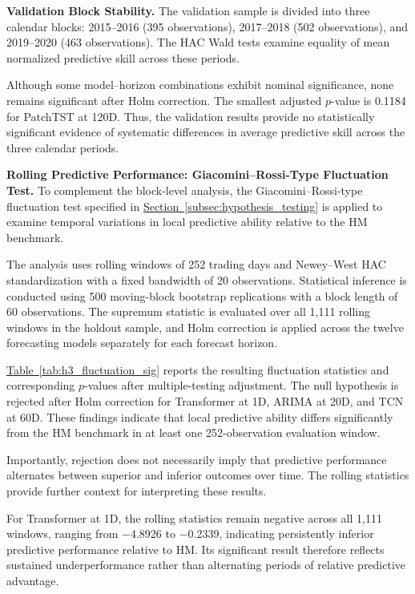\documentclass[12pt,twoside]{ord}
\begin{document}
\noindent\textbf{Validation Block Stability.}
The validation sample is divided into three calendar blocks: 2015--2016 (395 observations), 2017--2018 (502 observations), and 2019--2020 (463 observations). The HAC Wald tests examine equality of mean normalized predictive skill across these periods.

Although some model--horizon combinations exhibit nominal significance, none remains significant after Holm correction. The smallest adjusted $p$-value is 0.1184 for PatchTST at 120D. Thus, the validation results provide no statistically significant evidence of systematic differences in average predictive skill across the three calendar periods.

\medskip
\noindent\textbf{Rolling Predictive Performance: Giacomini--Rossi-Type Fluctuation Test.}
To complement the block-level analysis, the Giacomini--Rossi-type fluctuation test specified in \hyperref[subsec:hypothesis_testing]{Section~\ref*{subsec:hypothesis_testing}} is applied to examine temporal variations in local predictive ability relative to the HM benchmark.

The analysis uses rolling windows of 252 trading days and Newey--West HAC standardization with a fixed bandwidth of 20 observations. Statistical inference is conducted using 500 moving-block bootstrap replications with a block length of 60 observations. The supremum statistic is evaluated over all 1,111 rolling windows in the holdout sample, and Holm correction is applied across the twelve forecasting models separately for each forecast horizon.

\hyperref[tab:h3_fluctuation_sig]{Table~\ref*{tab:h3_fluctuation_sig}} reports the resulting fluctuation statistics and corresponding $p$-values after multiple-testing adjustment. The null hypothesis is rejected after Holm correction for Transformer at 1D, ARIMA at 20D, and TCN at 60D. These findings indicate that local predictive ability differs significantly from the HM benchmark in at least one 252-observation evaluation window.

Importantly, rejection does not necessarily imply that predictive performance alternates between superior and inferior outcomes over time. The rolling statistics provide further context for interpreting these results.

For Transformer at 1D, the rolling statistics remain negative across all 1,111 windows, ranging from $-$4.8926 to $-$0.2339, indicating persistently inferior predictive performance relative to HM. Its significant result therefore reflects sustained underperformance rather than alternating periods of relative predictive advantage.
\end{document}
